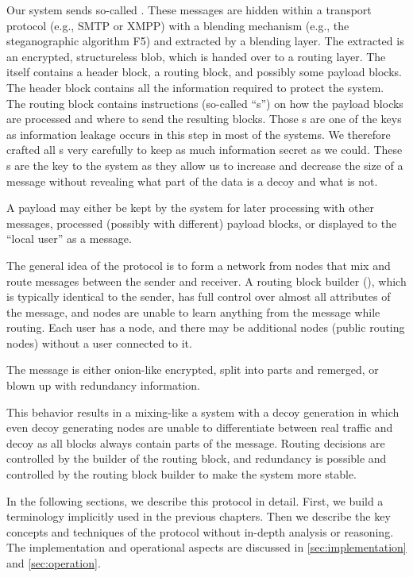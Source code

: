Our system sends so-called \VortexMessages. These messages are hidden within a transport protocol (e.g., SMTP or XMPP) with a blending mechanism (e.g., the steganographic algorithm F5) and extracted by a blending layer. The extracted \VortexMessage{} is an encrypted, structureless blob, which is handed over to a routing layer. The \VortexMessage{} itself contains a header block, a routing block, and possibly some payload blocks. The header block contains all the information required to protect the system. The routing block contains instructions (so-called ``s'') on how the payload blocks are processed and where to send the resulting blocks. Those s are one of the keys as information leakage occurs in this step in most of the systems. We therefore crafted all s very carefully to keep as much information secret as we could. These s are the key to the system as they allow us to increase and decrease the size of a message without revealing what part of the data is a decoy and what is not.

A payload may either be kept by the system for later processing with other messages, processed (possibly with different) payload blocks, or displayed to the ``local user'' as a message.

The general idea of the protocol is to form a network from nodes that mix and route messages between the sender and receiver. A routing block builder (), which is typically identical to the sender, has full control over almost all attributes of the message, and nodes are unable to learn anything from the message while routing. Each user has a node, and there may be additional nodes (public routing nodes) without a user connected to it. 

The message is either onion-like encrypted, split into parts and remerged, or blown up with redundancy information. 

This behavior results in a mixing-like a system with a decoy generation in which even decoy generating nodes are unable to differentiate between real traffic and decoy as all blocks always contain parts of the message. Routing decisions are controlled by the builder of the routing block, and redundancy is possible and controlled by the routing block builder to make the system more stable.

In the following sections, we describe this protocol in detail. First, we build a terminology implicitly used in the previous chapters. Then we describe the key concepts and techniques of the protocol without in-depth analysis or reasoning. The implementation and operational aspects are discussed in \cref{sec:implementation} and \cref{sec:operation}. 


